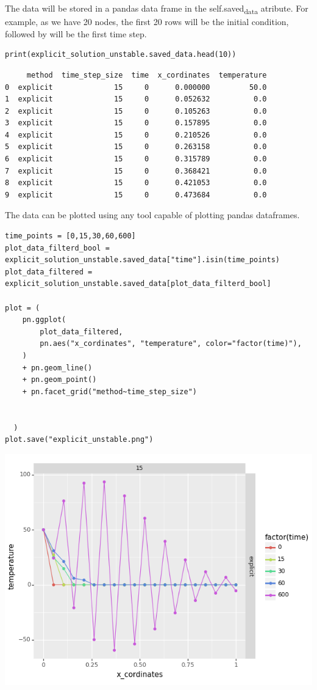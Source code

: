 \documentclass[letterpaper, 11pt]{article}
\begin{document}
The data will be stored in a pandas data frame in the self.saved\textsubscript{data} atribute. For example, as we have 20 nodes, the first 20 rows will be the initial condition, followed by will be the first time step.


\begin{verbatim}
print(explicit_solution_unstable.saved_data.head(10))

\end{verbatim}

\begin{verbatim}
     method  time_step_size  time  x_cordinates  temperature
0  explicit              15     0      0.000000         50.0
1  explicit              15     0      0.052632          0.0
2  explicit              15     0      0.105263          0.0
3  explicit              15     0      0.157895          0.0
4  explicit              15     0      0.210526          0.0
5  explicit              15     0      0.263158          0.0
6  explicit              15     0      0.315789          0.0
7  explicit              15     0      0.368421          0.0
8  explicit              15     0      0.421053          0.0
9  explicit              15     0      0.473684          0.0
\end{verbatim}


The data can be plotted using any tool capable of plotting pandas dataframes.

\begin{verbatim}
time_points = [0,15,30,60,600]
plot_data_filterd_bool = explicit_solution_unstable.saved_data["time"].isin(time_points)
plot_data_filtered = explicit_solution_unstable.saved_data[plot_data_filterd_bool]

plot = (
    pn.ggplot(
        plot_data_filtered,
        pn.aes("x_cordinates", "temperature", color="factor(time)"),
    )
    + pn.geom_line()
    + pn.geom_point()
    + pn.facet_grid("method~time_step_size")


  )
plot.save("explicit_unstable.png")

\end{verbatim}

\begin{center}
\includegraphics[width=.9\linewidth]{explicit_unstable.png}
\end{center}
\end{document}
